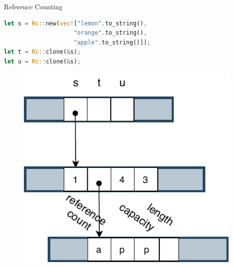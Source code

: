 \documentclass[9pt]{beamer}
\begin{document}
\begin{frame}[t, fragile]{Reference Counting}
\vspace{-0.5cm}
\begin{minipage}{0.7\linewidth}
\begin{lstlisting}[language=Rust]
let s = Rc::new(vec!["lemon".to_string(), 
                    "orange".to_string(), 
                    "apple".to_string()]);
let t = Rc::clone(&s);
let u = Rc::clone(&s); 
\end{lstlisting}
\end{minipage}     

    \begin{minipage}{0.3\linewidth}
        \begin{figure}[hp]
            \centering
            \begin{center}
                    \includegraphics[width=1.0\textwidth]{images/rc1.pdf}
                    \captionsetup{labelformat=empty}
            \end{center}
            

\end{figure}
\end{minipage}
\end{frame}
\end{document}
